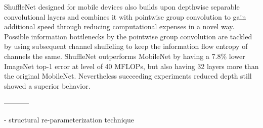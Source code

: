 ShuffleNet designed for mobile devices also builds upon depthwise separable convolutional layers and combines it with pointwise group convolution to gain additional speed through reducing computational expenses in a novel way. Possible information bottlenecks by the pointwise group convolution are tackled by using subsequent channel shuffeling to keep the information flow entropy of channels the same. ShuffleNet outperforms MobileNet by having a 7.8\% lower ImageNet top-1 error at level of 40 MFLOPs, but also having 32 layers more than the original MobileNet. Nevertheless succeeding experiments reduced depth still showed a superior behavior. \cite{XiangyuZhang.2017}

-----------

- structural re-parameterization technique